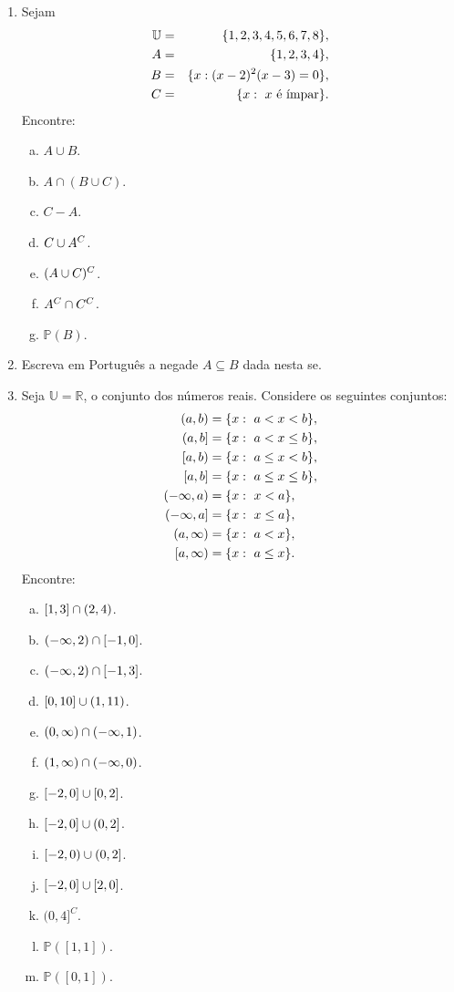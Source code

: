 \begin{enumerate}[{\bf 1.}]
\item Sejam
\begin{eqnarray*}
\mathbb{U}&=&\{1,2,3,4,5,6,7,8\},\\
A&=&\{1,2,3,4\},\\
B&=&\{x:(x-2)^2(x-3)=0\},\\
C&=&\{x:\espaco x \textrm{ \'e \ih mpar}\}.
\end{eqnarray*}
Encontre:
\begin{enumerate}[a)]
\item $A\cup B$.
\item $A\cap(B\cup C)$.
\item $C-A$.
\item $C\cup A^C$.
\item $(A\cup C)^C$.
\item $A^C\cap C^C$.
\item $\mathbb{P}(B)$.
\end{enumerate}

\item Escreva em Portugu\^es a nega\cao de $A\subseteq B$ dada nesta se\caoi.

\item\label{conjuntos3} Seja $\mathbb{U}=\mathbb{R}$, o conjunto dos n\'umeros reais. Considere os seguintes conjuntos:
\begin{equation*}
 \begin{aligned}
(a,b)&=\{x:\espaco a<x<b\},\\
(a,b]&=\{x:\espaco a<x\leq b\},\\
[a,b)&=\{x:\espaco a\leq x< b\},\\
[a,b]&=\{x:\espaco a\leq x\leq b\},\\
(-\infty,a)&=\{x:\espaco x<a\},\\
(-\infty,a]&=\{x:\espaco x\leq a\},\\
(a,\infty)&=\{x:\espaco a<x\},\\
[a,\infty)&=\{x:\espaco a\leq x\}.
 \end{aligned}
\end{equation*}
Encontre:
\begin{enumerate}[a)]
\item $[1,3]\cap(2,4)$.
\item $(-\infty,2)\cap[-1,0]$.
\item $(-\infty,2)\cap[-1,3]$.
\item $[0,10]\cup(1,11)$.
\item $(0,\infty)\cap(-\infty,1)$.
\item $(1,\infty)\cap(-\infty,0)$.
\item $[-2,0]\cup[0,2]$.
\item $[-2,0]\cup(0,2]$.
\item $[-2,0)\cup(0,2]$.
\item $[-2,0]\cup[2,0]$.
\item $(0,4]^C$.
\item $\mathbb{P}([1,1])$.
\item $\mathbb{P}([0,1])$.
\end{enumerate}


\end{enumerate}
